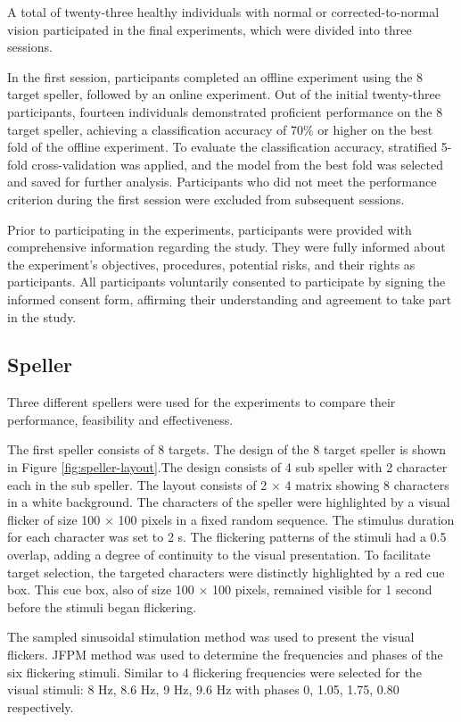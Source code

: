 A total of twenty-three healthy individuals with normal or corrected-to-normal vision participated in the final experiments, which were divided into three sessions.

In the first session, participants completed an offline experiment using the 8 target speller, followed by an online experiment. Out of the initial twenty-three participants, fourteen individuals demonstrated proficient performance on the 8 target speller, achieving a classification accuracy of 70\% or higher on the best fold of the offline experiment. To evaluate the classification accuracy, stratified 5-fold cross-validation was applied, and the model from the best fold was selected and saved for further analysis. Participants who did not meet the performance criterion during the first session were excluded from subsequent sessions.

 Prior to participating in the experiments, participants were provided with comprehensive information regarding the study. They were fully informed about the experiment's objectives, procedures, potential risks, and their rights as participants. All participants voluntarily consented to participate by signing the informed consent form, affirming their understanding and agreement to take part in the study.


\subsection{Speller}

Three different spellers were used for the experiments to compare their performance, feasibility and effectiveness.

The first speller consists of 8 targets. The design of the 8 target speller is shown in Figure \ref{fig:speller-layout}.The design consists of 4 sub speller with 2 character each in the sub speller. The layout consists of 2 $\times$ 4 matrix showing 8 characters in a white background. The characters of the speller were highlighted by a visual flicker of size 100 $\times$ 100 pixels in a fixed random sequence. The stimulus duration for each character was set to 2 s. The flickering patterns of the stimuli had a 0.5 overlap, adding a degree of continuity to the visual presentation. To facilitate target selection, the targeted characters were distinctly highlighted by a red cue box. This cue box, also of size 100 $\times$ 100 pixels, remained visible for 1 second before the stimuli began flickering.

The sampled sinusoidal stimulation method \cite{chen2014high} was used to present the visual flickers. JFPM method \cite{chen2015high} was used to determine the frequencies and phases of the six flickering stimuli. Similar to \cite{xu2020implementing} 4 flickering frequencies were selected for the visual stimuli: 8 Hz, 8.6 Hz, 9 Hz, 9.6 Hz with phases 0, 1.05, 1.75, 0.80 respectively. 

